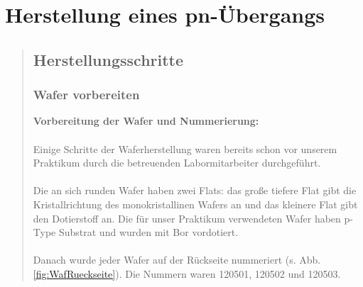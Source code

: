 \section{Herstellung eines pn-Übergangs}
\begin{quote}

	\subsection{Herstellungsschritte}


		\subsubsection{Wafer vorbereiten}

			\textbf{Vorbereitung der Wafer und Nummerierung:}\\
			\\
			Einige Schritte der Waferherstellung waren bereits schon vor
			unserem Praktikum durch die betreuenden Labormitarbeiter
			durchgeführt.\\
			\\
			Die an sich runden Wafer haben zwei Flats: das große tiefere Flat
			gibt die Kristallrichtung des monokristallinen Wafers an und das
			kleinere Flat gibt den Dotierstoff an. Die für unser Praktikum
			verwendeten Wafer haben p-Type Substrat und wurden  mit Bor
			vordotiert.\\
			\\
			Danach wurde jeder Wafer auf der Rückseite nummeriert
			(s. Abb. \ref{fig:WafRueckseite}).	Die Nummern waren 120501, 120502
			und 120503.\\

			\vspace{2em}


\end{quote}
